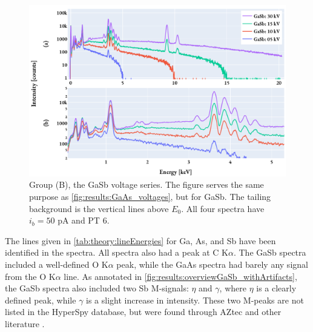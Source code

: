 \begin{figure}[hbtp]
    \centering
    \includegraphics[width=0.85\linewidth]{figures/results/GaSb_voltages.pdf}
    \caption{
        Group (B), the GaSb voltage series.
        The figure serves the same purpose as \cref{fig:results:GaAs_voltages}, but for GaSb.
        The tailing background is the vertical lines above $E_0$.
        All four spectra have $i_b = 50$ pA and PT $6$.
    }
    \label{fig:results:GaSb_voltages}
\end{figure}




The lines given in \cref{tab:theory:lineEnergies} for Ga, As, and Sb have been identified in the spectra.
All spectra also had a peak at C K$\alpha$.
The GaSb spectra included a well-defined O K$\alpha$ peak, while the GaAs spectra had barely any signal from the O K$\alpha$ line.
As annotated in \cref{fig:results:overviewGaSb_withArtifacts}, the GaSb spectra also included two Sb M-signals: $\eta$ and $\gamma$, where $\eta$ is a clearly defined peak, while $\gamma$ is a slight increase in intensity.
These two M-peaks are not listed in the HyperSpy database, but were found through AZtec \cite{aztec_manual} and other literature \cite{liao2006practical}.




